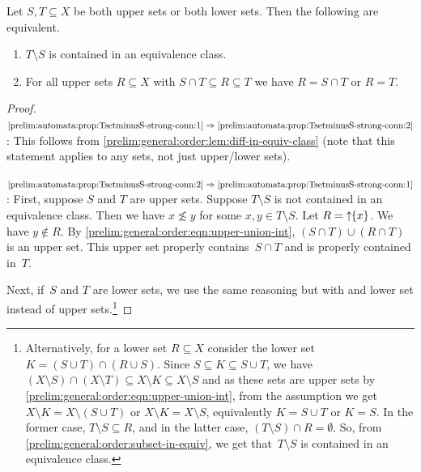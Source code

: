 \begin{proposition} \label{prelim:automata:prop:TsetminusS-strong-conn}
	Let $S, T \subseteq X$ be both upper sets or both lower sets.
    Then the following are equivalent.
    
    \begin{enumerate}
    \item \label{prelim:automata:prop:TsetminusS-strong-conn:1} $T \setminus S$
    is contained in an equivalence class.
    
    \item \label{prelim:automata:prop:TsetminusS-strong-conn:2} For all upper sets $R \subseteq X$ with 
    $S \cap T \subseteq R \subseteq T$ we have $R = S \cap T$ or $R = T$.
    \end{enumerate}	
\end{proposition}
\begin{proof}
$\ref{prelim:automata:prop:TsetminusS-strong-conn:1} \Rightarrow \ref{prelim:automata:prop:TsetminusS-strong-conn:2}$: This follows from \cref{prelim:general:order:lem:diff-in-equiv-class} (note that this statement applies to any sets, not just upper/lower sets).
		
$\ref{prelim:automata:prop:TsetminusS-strong-conn:2} \Rightarrow \ref{prelim:automata:prop:TsetminusS-strong-conn:1}$: 
First, suppose $S$ and $T$ are upper sets.
Suppose $T \setminus S$ is not contained in an equivalence class.
Then we have $x \not\lesssim y$ for some $x,y \in T \setminus S$.
Let $R = \mbox{\ensuremath{\displaystyle \uparrow \!\!\{x\}}}$. We have $y \notin R$.
By \cref{prelim:general:order:eqn:upper-union-int}, $(S \cap T) \cup (R \cap T)$ is an upper set.
This upper set properly contains~$S\cap T$
and is properly contained in~$T$.
%

Next, if~$S$ and $T$ are lower sets, we use the same reasoning
but with 
and lower set instead of upper sets.\footnote{Alternatively, for a lower set $R \subseteq X$
consider the lower set $K = (S \cup T) \cap (R \cup S)$.
Since $S \subseteq K \subseteq S \cup T$,
we have $( X \setminus S ) \cap ( X \setminus T ) \subseteq X \setminus K \subseteq X \setminus S$
and as these sets are upper sets by \cref{prelim:general:order:eqn:upper-union-int},
from the assumption we get $X \setminus K = X \setminus ( S \cup T )$
or $X \setminus K = X \setminus S$, equivalently $K = S \cup T$ or $K = S$. In the former case, $T \setminus S \subseteq R$,
and in the latter case, $(T \setminus S) \cap R = \emptyset$.
So, from \cref{prelim:general:order:subset-in-equiv}, we get that~$T \setminus S$ is contained in an equivalence class.}
\end{proof}

